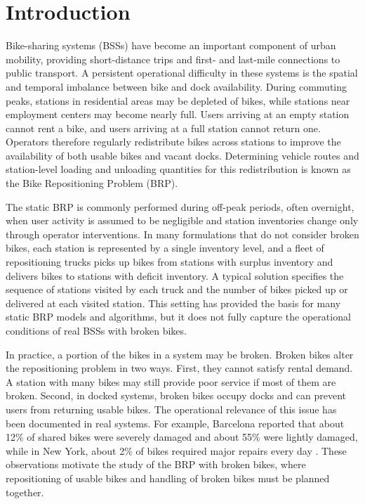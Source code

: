 \section{Introduction}\label{sec:intro}

Bike-sharing systems (BSSs) have become an important component of urban
mobility, providing short-distance trips and first- and last-mile connections
to public transport. A persistent operational difficulty in these systems is
the spatial and temporal imbalance between bike and dock
availability. During commuting peaks, stations in residential areas may be
depleted of bikes, while stations near employment centers may become nearly
full. Users arriving at an empty station cannot rent a bike, and users arriving
at a full station cannot return one. Operators therefore regularly redistribute
bikes across stations to improve the availability of both usable bikes and
vacant docks. Determining vehicle routes and station-level loading and
unloading quantities for this redistribution is known as the Bike
Repositioning Problem (BRP).

The static BRP is commonly performed during off-peak periods, often overnight,
when user activity is assumed to be negligible and station inventories change
only through operator interventions. In many formulations that do not consider
broken bikes, each station is represented by a single inventory level, and a
fleet of repositioning trucks picks up bikes from stations with surplus
inventory and delivers bikes to stations with deficit inventory. A typical
solution specifies the sequence of stations visited by each truck and the
number of bikes picked up or delivered at each visited station. This setting has provided
the basis for many static BRP models and algorithms, but it does not fully
capture the operational conditions of real BSSs with broken bikes.

In practice, a portion of the bikes in a system may be broken. Broken bikes
alter the repositioning problem in two ways. First, they
cannot satisfy rental demand. A station with many bikes may still provide poor
service if most of them are broken. Second, in docked systems, broken bikes
occupy docks and can prevent users from returning usable bikes. The
operational relevance of this issue has been documented in real systems. For
example, Barcelona reported that about 12\% of shared bikes were severely
damaged and about 55\% were lightly damaged, while in New York, about 2\% of
bikes required major repairs every day
\citep{huRepositioningBikeSharing2025,kaspiDetectionUnusableBicycles2016}.
These observations motivate the study of the BRP with broken bikes, where
repositioning of usable bikes and handling of broken bikes must be planned
together.

